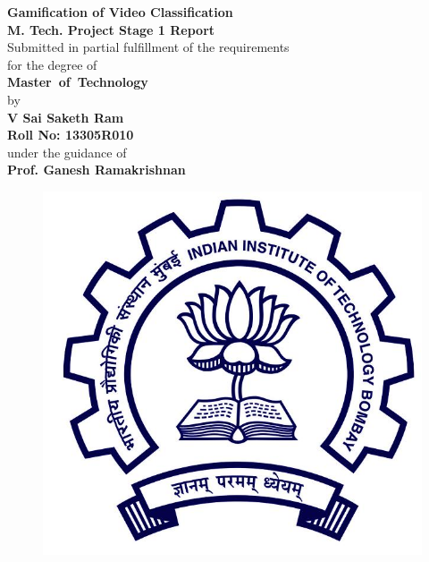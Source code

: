 \documentclass[12pt]{article}
\begin{document}
\def\title{Gamification of Video Classification}
\def\what{M. Tech. Project Stage 1 Report}
\def\degree{Master~of~Technology}
\def\who{V Sai Saketh Ram}
\def\roll{13305R010}
\def\guide{Prof. Ganesh Ramakrishnan}
\begin{center}
\vspace{0pt plus 2fil}
{\LARGE \bf \title}\\ 
\vspace{0pt plus 0.7fil}  
{\bf \what}\\
\vspace{0pt plus 0.3fil}
Submitted in partial fulfillment of the requirements\\
for the degree of\\
\vspace{0pt plus 0.2fil}
{\bf \degree}\\
\vspace{0pt plus 0.5fil}
by\\ 
\vspace{0pt plus 0.2fil}
{\bf \who}\\
\vspace{0pt plus 0.05fil}
{\bf Roll No: \roll} \\
\vspace{0pt plus 0.5fil}
under the guidance of\\
\vspace{0pt plus 0.2fil}
{\bf \guide}\\
\vspace{0pt plus 2fil}





\begin{figure}[h]
\begin{center}
 


\includegraphics{images/iitblogo.jpg}
\end{center}
\end{figure}






\end{center}
\end{document}
